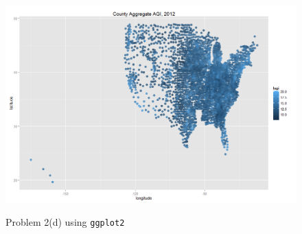 \documentclass[11pt]{article}
\theoremstyle{plain}
\theoremstyle{definition}
\begin{document}
\begin{figure}[p]
	\includegraphics[scale=.6]{"hw3prob2c-2"}
	\label{}
	\caption{Problem 2(d) using \texttt{ggplot2}}
\end{figure}
\end{document}
